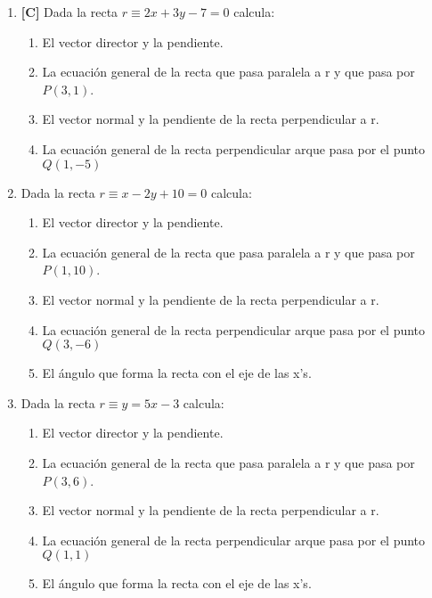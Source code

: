 \begin{enumerate}[topsep=0pt]

	\item \textbf{[C]}  Dada la recta $r \equiv 2x + 3y -7 = 0$ calcula:
	\begin{enumerate}[topsep=0pt, label=\arabic*)]
		\item El vector director y la pendiente.
		\item La ecuación general de la recta que pasa paralela a r y que pasa por $P(3,1)$.
		\item El vector normal y la pendiente de la recta perpendicular a r.
		\item La ecuación general de la recta perpendicular arque pasa por el punto $Q(1,-5)$
	\end{enumerate}


	\item  Dada la recta $r \equiv x - 2y +10 = 0$ calcula:
	\begin{enumerate}[topsep=0pt, label=\arabic*)]
		\item El vector director y la pendiente.
		\item La ecuación general de la recta que pasa paralela a r y que pasa por $P(1,10)$.
		\item El vector normal y la pendiente de la recta perpendicular a r.
		\item La ecuación general de la recta perpendicular arque pasa por el punto $Q(3,-6)$
		\item El ángulo que forma la recta con el eje de las x's.
	\end{enumerate}


	\item  Dada la recta $r \equiv y = 5x -3$ calcula:
	\begin{enumerate}[topsep=0pt, label=\arabic*)]
		\item El vector director y la pendiente.
		\item La ecuación general de la recta que pasa paralela a r y que pasa por $P(3,6)$.
		\item El vector normal y la pendiente de la recta perpendicular a r.
		\item La ecuación general de la recta perpendicular arque pasa por el punto $Q(1,1)$
		\item El ángulo que forma la recta con el eje de las x's.
	\end{enumerate}
	
\end{enumerate}


